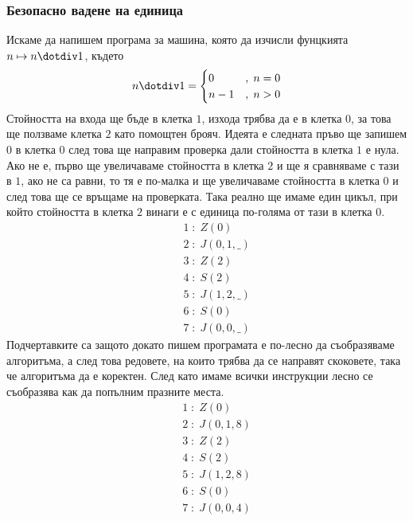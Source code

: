 \documentclass[14pt]{extarticle}
\begin{document}
\subsubsection*{Безопасно вадене на единица}
Искаме да напишем програма за машина, която да изчисли фунцкията \(n \mapsto n \dotdiv 1\), където
\begin{align*}
    n \dotdiv 1 = \begin{cases}
    0 &,\; n = 0 \\
    n - 1 &,\; n > 0
    \end{cases}
\end{align*}
Стойността на входа ще бъде в клетка \(1\), изхода трябва да е в клетка \(0\), за това ще ползваме клетка \(2\) като помощтен брояч.
Идеята е следната пръво ще запишем \(0\) в клетка \(0\) след това ще направим проверка дали стойността в клетка \(1\) е нула.
Ако не е, първо ще увеличаваме стойността в клетка \(2\) и ще я сравняваме с тази в \(1\), ако не са равни, то тя е по-малка и ще увеличаваме стойността в клетка \(0\) и след това ще се връщаме на проверката. Така реално ще имаме един цикъл, при който стойността в клетка \(2\) винаги е с единица по-голяма от тази в клетка \(0\).
\begin{align*}
    & \quad 1 \; : \; Z(0) \\
    & \quad 2 \; : \; J(0, 1, \_) \\
    & \quad 3 \; : \; Z(2) \\
    & \quad 4 \; : \; S(2) \\
    & \quad 5 \; : \; J(1, 2, \_) \\
    & \quad 6 \; : \; S(0) \\
    & \quad 7 \; : \; J(0, 0, \_)
\end{align*}
Подчертавките са защото докато пишем програмата е по-лесно да съобразяваме алгоритъма, а след това редовете, на които трябва да се направят скоковете, така че алгоритъма да е коректен. След като имаме всички инструкции лесно се съобразява как да попълним празните места.
\begin{align*}
    & \quad 1 \; : \; Z(0) \\
    & \quad 2 \; : \; J(0, 1, 8) \\
    & \quad 3 \; : \; Z(2) \\
    & \quad 4 \; : \; S(2) \\
    & \quad 5 \; : \; J(1, 2, 8) \\
    & \quad 6 \; : \; S(0) \\
    & \quad 7 \; : \; J(0, 0, 4)
\end{align*}
\end{document}
